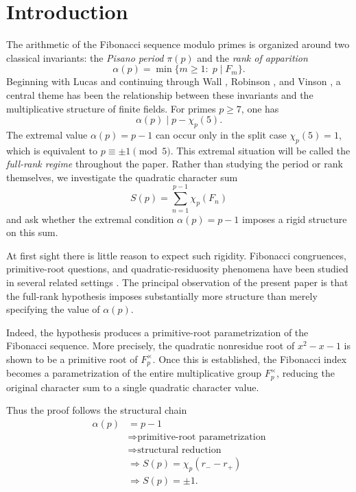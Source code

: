 \documentclass[preprint,12pt]{elsarticle}
\def\F{F}%
\numberwithin{equation}{section}
\theoremstyle{plain}
\theoremstyle{definition}
\newcommand{\F}{\mathbb{F}}
\begin{document}
\section{Introduction}\label{sec:intro}
 
The arithmetic of the Fibonacci sequence modulo primes is organized
around two classical invariants: the \emph{Pisano period} $\pi(p)$
and the \emph{rank of apparition}
\[
\alpha(p)
=
\min\{m\ge1:\;p\mid F_m\}.
\]
Beginning with Lucas \cite{Lucas1878} and continuing through Wall
\cite{Wall1960}, Robinson \cite{Robinson1963}, and Vinson
\cite{Vinson1963}, a central theme has been the relationship between
these invariants and the multiplicative structure of finite fields.
For primes $p\ge7$, one has
\[
\alpha(p)\mid p-\chi_p(5).
\]
The extremal value $\alpha(p)=p-1$ can occur only in
the split case $\chi_p(5)=1$, which is equivalent to
$p\equiv\pm1\pmod5$. This extremal situation will be called the
\emph{full-rank regime} throughout the paper.
Rather than studying the period or rank themselves, we investigate
the quadratic character sum
\[
S(p)
=
\sum_{n=1}^{p-1}\chi_p(F_n)
\]
and ask whether the extremal condition $\alpha(p)=p-1$ imposes a
rigid structure on this sum.
 
At first sight there is little reason to expect such rigidity. Fibonacci congruences, primitive-root questions, and
quadratic-residuosity phenomena have been studied in several related
settings \cite{Williams1982,SunSun1992,Sun2019}. The principal
observation of the present paper is that the full-rank hypothesis
imposes substantially more structure than merely specifying the
value of $\alpha(p)$.
 
Indeed, the hypothesis produces a primitive-root parametrization of
the Fibonacci sequence. More precisely, the quadratic nonresidue root
of $x^2-x-1$ is shown to be a primitive root of $\F_p^\times$.
Once this is established, the Fibonacci index becomes a parametrization of the entire multiplicative group
$\F_p^\times$, reducing the original character sum to a single
quadratic character value.
 
Thus the proof follows the structural chain
\begin{equation}\label{eq:chain}
\boxed{
\begin{aligned}
\alpha(p) &= p-1 \\
&\Longrightarrow \text{primitive-root parametrization} \\
&\Longrightarrow \text{structural reduction} \\
&\Longrightarrow S(p)=\chi_p(r_- - r_+) \\
&\Longrightarrow S(p)=\pm1.
\end{aligned}
}
\end{equation}
 
\end{document}
